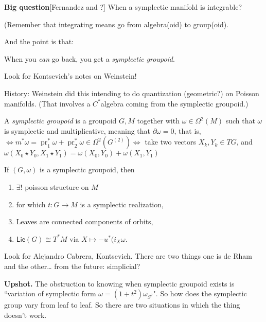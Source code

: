 \medskip\noindent
{\bf Big question}[Fernandez and ?]
When a symplectic manifold is integrable?


(Remember that integrating means go from algebra(oid) to group(oid).

And the point is that:

\medskip\noindent
When you {\it can} go back, you get a \textit{ symplectic groupoid}.

\begin{remark}
Look for Kontsevich's notes on Weinstein!
\end{remark}

\begin{remark}
History: Weinstein did this intending to do quantization (geometric?) on Poisson manifolds. (That involves a \(C^*\)algebra coming from the symplectic groupoid.)
\end{remark}

\begin{definition}
A {\it symplectic groupoid} is a groupoid \(G, M\) together with  \(\omega \in \Omega^2(M)\) such that \(\omega\) is symplectic and multiplicative, meaning that \(\partial  \omega =0\), that is, \(\iff m^*\omega=\operatorname{pr}_1^*\omega+\operatorname{pr}^*_2\omega\in \Omega^{2}(G^{(2)})\iff\) take two vectors \( X_k,Y_k \in TG\), and \(\omega(X_0 \star Y_0,X_1\star Y_1) =  \omega(X_0,Y_0) + \omega (X_1,Y_1)\)
\end{definition}

\begin{theorem}
If \((G, \omega)\) is a symplectic groupoid, then
\begin{enumerate}
\item \(\exists !\) poisson structure on \(M\) 
\item for which \(t: G \to M\) is a symplectic realization,
\item  Leaves are connected components of orbits,
\item \(\mathsf{Lie}(G)\cong T^*M\) via \(X \mapsto -u ^*(i_X \omega\).
\end{enumerate}
\end{theorem}

\begin{remark}
Look for Alejandro Cabrera, Kontsevich. There are two things one is de Rham and the other… from the future: simplicial?
\end{remark}

\medskip\noindent
{\bf Upshot.} The obstruction to knowing when symplectic groupoid exists is ``variation of symplectic form \(\omega=(1+t^2) \omega_{S^2}\)". So how does the symplectic group vary from leaf to leaf. So there are two situations in which the thing doesn't work.



